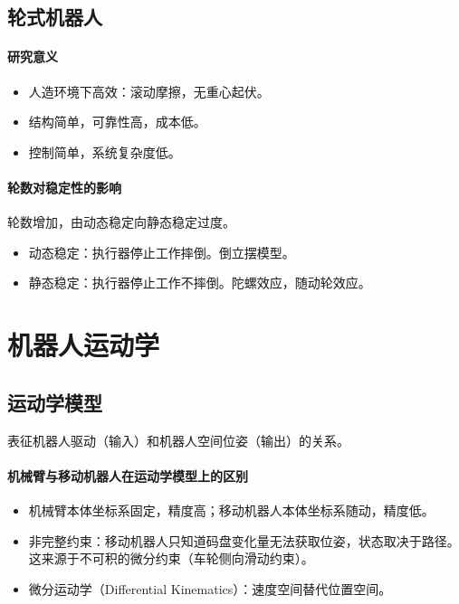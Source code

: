 \documentclass[
12pt, %
a4paper, 
oneside, %
headinclude,footinclude, %
]{scrartcl}
\begin{document}
\subsection[轮式机器人]{轮式机器人}
\paragraph{研究意义}
\begin{itemize}
\item 人造环境下高效：滚动摩擦，无重心起伏。
\item 结构简单，可靠性高，成本低。
\item 控制简单，系统复杂度低。
\end{itemize}
\paragraph{轮数对稳定性的影响}
轮数增加，由动态稳定向静态稳定过度。
\begin{itemize}
\item 动态稳定：执行器停止工作摔倒。倒立摆模型。    
\item 静态稳定：执行器停止工作不摔倒。陀螺效应，随动轮效应。
\end{itemize}
\section{机器人运动学}
\subsection[运动学模型]{运动学模型}
表征机器人驱动（输入）和机器人空间位姿（输出）的关系。
\paragraph{机械臂与移动机器人在运动学模型上的区别}
\begin{itemize}
\item 机械臂本体坐标系固定，精度高；移动机器人本体坐标系随动，精度低。
\item 非完整约束：移动机器人只知道码盘变化量无法获取位姿，状态取决于路径。这来源于不可积的微分约束（车轮侧向滑动约束）。
\item 微分运动学（Differential Kinematics）：速度空间替代位置空间。
\end{itemize}
\end{document}

